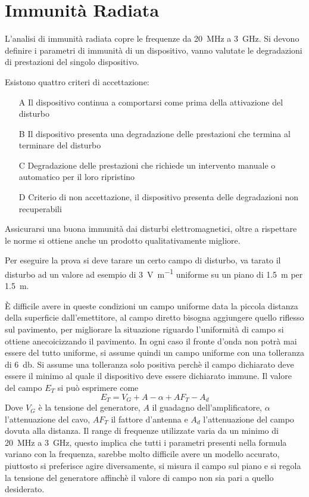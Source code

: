 
\section{Immunità Radiata}
L'analisi di immunità radiata copre le frequenze da \SI{20}{\mega\hertz} a \SI{3}{\giga\hertz}.
Si devono definire i parametri di immunità di un dispositivo, vanno valutate le degradazioni di prestazioni
del singolo dispositivo.

Esistono quattro criteri di accettazione:
\begin{itemize}
 \item [A] Il dispositivo continua a comportarsi come prima della attivazione del disturbo
 \item [B] Il dispositivo presenta una degradazione delle prestazioni che termina al terminare del disturbo 
 \item [C] Degradazione delle prestazioni che richiede un intervento manuale o automatico per il loro ripristino
 \item [D] Criterio di non accettazione, il dispositivo presenta delle degradazioni non recuperabili
\end{itemize}

Assicurarsi una buona immunità dai disturbi elettromagnetici, oltre a rispettare le norme si ottiene
anche un prodotto qualitativamente migliore.

Per eseguire la prova si deve tarare un certo campo di disturbo, va tarato il disturbo ad un valore
ad esempio di \SI[per-mode=symbol]{3}{\volt\per\meter} uniforme su un piano di \SI{1.5}{\meter} per \SI{1.5}{\meter}.

È difficile avere in queste condizioni un campo uniforme data la piccola distanza della superficie dall'emettitore,
al campo diretto bisogna aggiungere quello riflesso sul pavimento, per migliorare la situazione riguardo 
l'uniformità di campo si ottiene anecoicizzando il pavimento.
In ogni caso il fronte d'onda non potrà mai essere del tutto uniforme, si assume quindi un campo uniforme con una 
tolleranza di \SI{+6}{\decibel}. Si assume una tolleranza solo positiva perchè il campo dichiarato 
deve essere il minimo al quale il dispositivo deve essere dichiarato immune.
Il valore del campo $E_T$ si può esprimere come
$$
E_T = V_G + A - \alpha + AF_T -A_d
$$
Dove $V_G$ è la tensione del generatore, $A$ il guadagno dell'amplificatore, $\alpha$ l'attenuazione
del cavo, $AF_T$ il fattore d'antenna e $A_d$ l'attenuazione del campo dovuta alla distanza.
Il range di frequenze utilizzate varia da un minimo di \SI{20}{\mega\hertz} a \SI{3}{\giga\hertz},
questo implica che tutti i parametri presenti nella formula variano con la frequenza, sarebbe molto difficile
avere un modello accurato, piuttosto si preferisce agire diversamente, si misura il campo
sul piano e si regola la tensione del generatore affinchè il valore di campo non sia 
pari a quello desiderato.

